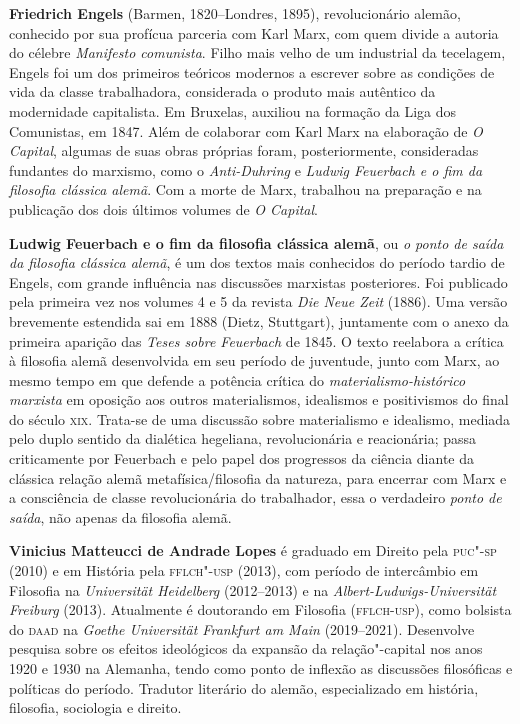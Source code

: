 \textbf{Friedrich Engels} (Barmen, 1820--Londres, 1895), revolucionário alemão,
conhecido por sua profícua parceria com Karl Marx, com quem divide a autoria do célebre \textit{Manifesto comunista}. Filho mais velho
de um industrial da tecelagem, Engels foi um dos primeiros teóricos modernos a escrever sobre as condições de vida da classe trabalhadora, considerada o produto mais autêntico da modernidade capitalista. Em Bruxelas, auxiliou na formação da Liga
dos Comunistas, em 1847. Além de colaborar com Karl Marx na elaboração de \textit{O Capital}, algumas de suas obras próprias foram, posteriormente, consideradas fundantes do marxismo, como o \textit{Anti-Duhring} e \textit{Ludwig Feuerbach e o fim da filosofia clássica alemã}. Com a morte de Marx, trabalhou na preparação e na publicação dos dois últimos volumes de \textit{O Capital}.

\textbf{Ludwig Feuerbach e o fim da filosofia clássica alemã}, ou \emph{o
ponto de saída da filosofia clássica alemã}, é um dos textos mais
conhecidos do período tardio de Engels, com grande influência nas
discussões marxistas posteriores. Foi publicado
pela primeira vez nos volumes 4 e 5 da revista
\emph{Die Neue Zeit} (1886). Uma versão brevemente estendida sai em 1888 (Dietz, Stuttgart), juntamente com o anexo da primeira
aparição das \emph{Teses sobre Feuerbach} de 1845. O texto reelabora a crítica à filosofia alemã desenvolvida em seu período de juventude, junto com Marx, ao mesmo tempo em que defende a potência
crítica do \emph{materialismo-histórico marxista} em oposição aos outros
materialismos, idealismos e positivismos do final do século \textsc{xix}. Trata-se de uma discussão sobre materialismo e idealismo,
mediada pelo duplo sentido da dialética hegeliana,
revolucionária e reacionária; passa criticamente por Feuerbach e pelo
papel dos progressos da ciência diante da clássica relação alemã
metafísica/filosofia da natureza, para encerrar com Marx e a
consciência de classe revolucionária do trabalhador, essa o verdadeiro
\emph{ponto de saída}, não apenas da filosofia alemã.
        
\textbf{Vinicius Matteucci de Andrade Lopes} é graduado em Direito pela
\textsc{puc"-sp} (2010) e em História pela \textsc{fflch"-usp} (2013), com
período de intercâmbio em Filosofia na \emph{Universität Heidelberg} (2012--2013) e na
\emph{Albert-Ludwigs-Universität Freiburg} (2013). Atualmente é
doutorando em Filosofia (\textsc{fflch-usp}), como bolsista do \textsc{daad} na
\emph{Goethe Universität Frankfurt am Main} (2019--2021). Desenvolve
pesquisa sobre os efeitos ideológicos da expansão da relação"-capital nos
anos 1920 e 1930 na Alemanha, tendo como ponto de inflexão as discussões
filosóficas e políticas do período. Tradutor literário do alemão,
especializado em história, filosofia, sociologia e direito.


